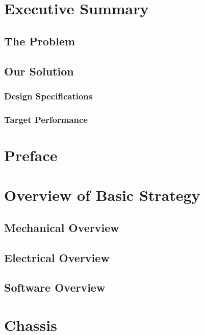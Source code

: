 \documentclass[12pt]{article}
\begin{document}
\begin{titlingpage}
\maketitle
\begin{abstract}
\end{abstract}
\end{titlingpage}

\tableofcontents
\section{Executive Summary}
\subsection{The Problem}
\subsection{Our Solution}
\subsubsection{Design Specifications}
\subsubsection{Target Performance}


\section{Preface}

\section{Overview of Basic Strategy}
\subsection{Mechanical Overview}
\subsection{Electrical Overview}
\subsection{Software Overview}

\section{Chassis}
\end{document}
